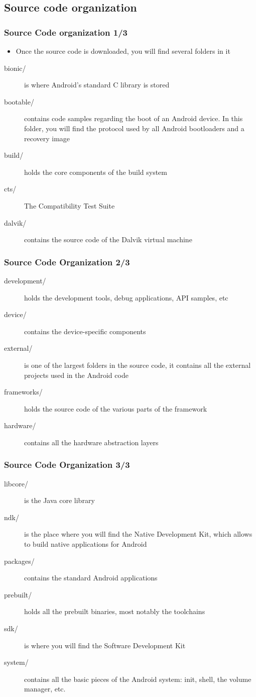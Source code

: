 \subsection{Source code organization}
\begin{frame}
  \frametitle{Source Code organization 1/3}
  \begin{itemize}
  \item Once the source code is downloaded, you will find several
    folders in it
  \end{itemize}
  \begin{description}
  \item[bionic/] is where Android's standard C library is stored
  \item[bootable/] contains code samples regarding the boot of an
    Android device. In this folder, you will find the protocol used by
    all Android bootloaders and a recovery image
  \item[build/] holds the core components of the build system
  \item[cts/] The Compatibility Test Suite
  \item[dalvik/] contains the source code of the Dalvik virtual
    machine
  \end{description}
\end{frame}

\begin{frame}
  \frametitle{Source Code Organization 2/3}
  \begin{description}
  \item[development/] holds the development tools, debug applications,
    API samples, etc
  \item[device/] contains the device-specific components
  \item[external/] is one of the largest folders in the source code, it
    contains all the external projects used in the Android code
  \item[frameworks/] holds the source code of the various parts of the
    framework
  \item[hardware/] contains all the hardware abstraction layers
  \end{description}
\end{frame}

\begin{frame}
  \frametitle{Source Code Organization 3/3}
  \begin{description}
  \item[libcore/] is the Java core library
  \item[ndk/] is the place where you will find the Native Development
    Kit, which allows to build native applications for Android
  \item[packages/] contains the standard Android applications
  \item[prebuilt/] holds all the prebuilt binaries, most notably the
    toolchains
  \item[sdk/] is where you will find the Software Development Kit
  \item[system/] contains all the basic pieces of the Android system:
    init, shell, the volume manager, etc.
  \end{description}
\end{frame}
